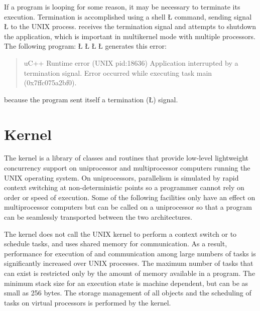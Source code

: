 \documentclass[openright,twoside]{report}
\begin{document}
If a \uC program is looping for some reason, it may be necessary to terminate its execution.
Termination is accomplished using a shell \LGinlinetrue\LGbegin\lgrinde\L{}\endlgrinde\LGend{} command, sending signal \LGinlinetrue\LGbegin\lgrinde\L{}\endlgrinde\LGend{} to the UNIX process.
\uC receives the termination signal and attempts to shutdown the application, which is important in multikernel mode with multiple processors.
The following program:
\LGinlinefalse\LGbegin\lgrinde
\L{}
\CE{}\L{}
\L{\LB{}}
\CE{}\L{\LB{\}}}
\endlgrinde\LGend
generates this error:
\begin{quote}
\BGfont
uC++ Runtime error (UNIX pid:18636) Application interrupted by a termination signal.
Error occurred while executing task main (0x7ffc075a2bf0).
\end{quote}
because the \uC program sent itself a termination (\LGinlinetrue\LGbegin\lgrinde\L{}\endlgrinde\LGend{}) signal.


\chapter{\texorpdfstring{\uC Kernel}{uC++ Kernel}}
\label{c:uC++kernel}

The \uC kernel is a library of classes and routines that provide low-level lightweight concurrency support on uniprocessor and multiprocessor computers running the UNIX operating system.
On uniprocessors, parallelism is simulated by rapid context switching at non-deterministic points so a programmer cannot rely on order or speed of execution.
Some of the following facilities only have an effect on multiprocessor computers but can be called on a uniprocessor so that a program can be seamlessly transported between the two architectures.

The \uC kernel does not call the UNIX kernel to perform a context switch or to schedule tasks, and uses shared memory for communication.
As a result, performance for execution of and communication among large numbers of tasks is significantly increased over UNIX processes.
The maximum number of tasks that can exist is restricted only by the amount of memory available in a program.
The minimum stack size for an execution state is machine dependent, but can be as small as 256 bytes.
The storage management of all \uC objects and the scheduling of tasks on virtual processors is performed by the \uC kernel.
\end{document}
